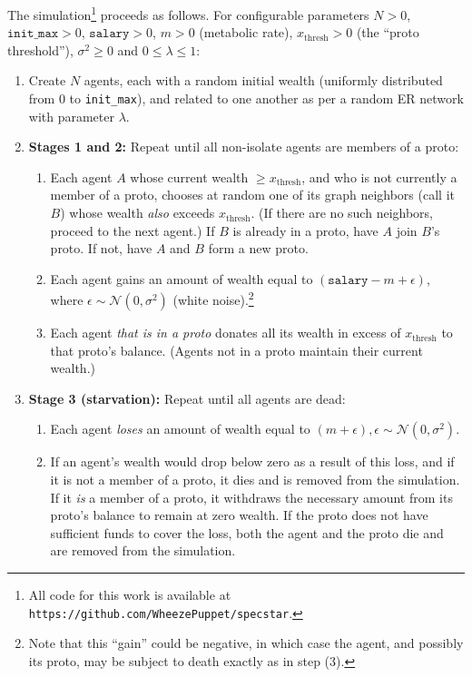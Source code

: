 The simulation\footnote{All code for this work is available at \texttt{https://github.com/WheezePuppet/specstar}.} proceeds as follows. For configurable parameters
$N > 0$,
$\texttt{init\_max} > 0$,
$\texttt{salary} > 0$,
$m > 0$ (metabolic rate),
$x_{\textrm{thresh}} > 0$ (the ``proto threshold''),
$\sigma^2 \ge 0$ and
$0 \le \lambda \le 1$:

\begin{enumerate}
\itemsep.1em
\item Create $N$ agents, each with a random initial wealth (uniformly distributed from 0 to \texttt{init\_max}), and related to one another as per a random ER network with parameter $\lambda$.
\item \textbf{Stages 1 and 2:} Repeat until all non-isolate agents are members of a proto:
    \begin{enumerate}
    \itemsep.1em
    \item Each agent $A$ whose current wealth $\ge x_{\textrm{thresh}}$, and who is not currently a member of a proto, chooses at random one of its graph neighbors (call it $B$) whose wealth \textit{also} exceeds $x_{\textrm{thresh}}$. (If there are no such neighbors, proceed to the next agent.) If $B$ is already in a proto, have $A$ join $B$'s proto. If not, have $A$ and $B$ form a new proto.
    \item Each agent gains an amount of wealth equal to $(\texttt{salary} - m + \epsilon)$, where $\epsilon \sim \mathcal{N}(0,\sigma^2)$ (white noise).\footnote{Note that this ``gain'' could be negative, in which case the agent, and possibly its proto, may be subject to death exactly as in step (3).}
    \item Each agent \textit{that is in a proto} donates all its wealth in excess of $x_{\textrm{thresh}}$ to that proto's balance. (Agents not in a proto maintain their current wealth.)
    \end{enumerate}
    \item \textbf{Stage 3 (starvation):} Repeat until all agents are dead:
        \begin{enumerate}
        \itemsep.1em
        \item Each agent \textit{loses} an amount of wealth equal to $(m + \epsilon), \epsilon \sim \mathcal{N}(0,\sigma^2)$.
        \item If an agent's wealth would drop below zero as a result of this loss, and if it is not a member of a proto, it dies and is removed from the simulation. If it \textit{is} a member of a proto, it withdraws the necessary amount from its proto's balance to remain at zero wealth. If the proto does not have sufficient funds to cover the loss, both the agent and the proto die and are removed from the simulation.
        \end{enumerate}
\end{enumerate}

